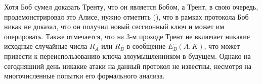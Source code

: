Хотя Боб сумел доказать Тренту, что он является Бобом, а Трент, в свою очередь, продемонстрировал это Алисе, нужно отметить (\cite{Zhou:Yu:Pan:Wang:2016}), что в рамках протокола Боб никак не доказал, что он получил новый сессионный ключ и может им оперировать. Также отмечается, что на 3-м проходе Трент не включает никакие исходные случайные числа $R_A$ или $R_B$ в сообщение $E_B(A, K)$, что может привести к переиспользованию ключа злоумышленником в будущем. Однако на сегодняшний день никакие атаки на данный протокол не известны, несмотря на многочисленные попытки его формального анализа.

